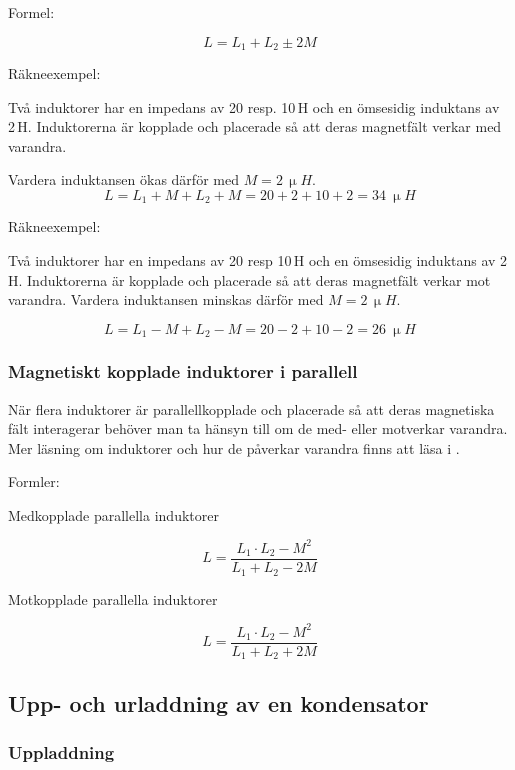 \noindent Formel:

\[L = L_1 +L_2 \pm 2M\]

\noindent Räkneexempel:

Två induktorer har en impedans av 20 resp. 10\,\textmu H och en ömsesidig
induktans av 2\,\textmu H.
Induktorerna är kopplade och placerade så att deras magnetfält verkar med
varandra.

Vardera induktansen ökas därför med \(M = 2\,\unit{\upmu H}\).
\[
L = L_1 + M + L_2 + M 
  = 20 + 2 + 10 + 2 
  = \SI{34}{\upmu H}
\]

\noindent Räkneexempel:

Två induktorer har en impedans av 20 resp 10\,\textmu H och en ömsesidig
induktans av 2\,\textmu H.
Induktorerna är kopplade och placerade så att deras magnetfält verkar mot
varandra.
Vardera induktansen minskas därför med \(M = 2\,\unit{\upmu H}\).

\[
L = L_1 - M + L_2 - M 
  = 20 - 2 + 10 - 2
  = \SI{26}{\upmu H}
\]
  
\subsubsection{Magnetiskt kopplade induktorer i parallell}
När flera induktorer är parallellkopplade och placerade så att deras magnetiska
fält interagerar behöver man ta hänsyn till om de med- eller motverkar varandra.
Mer läsning om induktorer och hur de påverkar varandra finns att läsa i
\cite{letrafo}.

\noindent Formler:

Medkopplade parallella induktorer

\[L = \frac{L_1 \cdot L_2 - M^2}{L_1 + L_2 - 2M}\]

Motkopplade parallella induktorer

\[L = \frac{L_1 \cdot L_2 - M^2}{L_1 + L_2 + 2M}\]

\subsection{Upp- och urladdning av en kondensator}

\subsubsection{Uppladdning}

